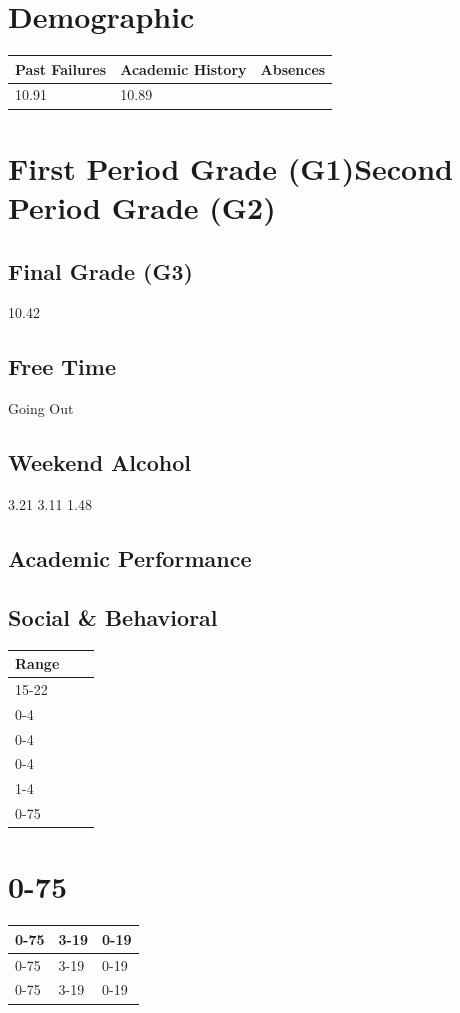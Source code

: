 \documentclass[twocolumn]{svjour3}
\begin{document}
\section{Demographic}
\begin{tabular}{lll}
\hline
Past Failures & Academic History & Absences \\
\hline
10.91 & 10.89 & \\
\hline
\end{tabular}

\section{First Period Grade (G1)Second Period Grade (G2)}
\subsection{Final Grade (G3)}
10.42
\subsection{Free Time}
Going Out
\subsection{Weekend Alcohol}
3.21
3.11
1.48
\subsection{Academic Performance}
\subsection{Social \& Behavioral}
\begin{tabular}{lll}
\hline
Range & & \\
\hline
15-22 & & \\
0-4 & & \\
0-4 & & \\
0-4 & & \\
1-4 & & \\
0-75 & & \\
\hline
\end{tabular}

\section{0-75}
\begin{tabular}{lll}
\hline
0-75 & 3-19 & 0-19 \\
\hline
0-75 & 3-19 & 0-19 \\
\hline
0-75 & 3-19 & 0-19 \\
\hline
\end{tabular}
\end{document}
